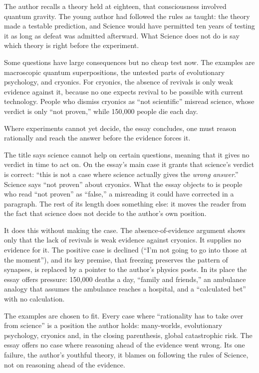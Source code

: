 \begin{afterword}
\summaryhead

The author recalls a theory held at eighteen, that consciousness involved quantum gravity. The young author had followed the rules as taught: the theory made a testable prediction, and Science would have permitted ten years of testing it as long as defeat was admitted afterward. What Science does not do is say which theory is right before the experiment.

Some questions have large consequences but no cheap test now. The examples are macroscopic quantum superpositions, the untested parts of evolutionary psychology, and cryonics. For cryonics, the absence of revivals is only weak evidence against it, because no one expects revival to be possible with current technology. People who dismiss cryonics as ``not scientific'' misread science, whose verdict is only ``not proven,'' while 150,000 people die each day.

Where experiments cannot yet decide, the essay concludes, one must reason rationally and reach the answer before the evidence forces it.

\responsehead

The title says science cannot help on certain questions, meaning that it gives no verdict in time to act on. On the essay's main case it grants that science's verdict is correct: ``this is not a case where science actually gives the \emph{wrong answer}.'' Science says ``not proven'' about cryonics. What the essay objects to is people who read ``not proven'' as ``false,'' a misreading it could have corrected in a paragraph. The rest of its length does something else: it moves the reader from the fact that science does not decide to the author's own position.

It does this without making the case. The absence-of-evidence argument shows only that the lack of revivals is weak evidence against cryonics. It supplies no evidence for it. The positive case is declined (``I'm not going to go into those at the moment''), and its key premise, that freezing preserves the pattern of synapses, is replaced by a pointer to the author's physics posts. In its place the essay offers pressure: 150,000 deaths a day, ``family and friends,'' an ambulance analogy that assumes the ambulance reaches a hospital, and a ``calculated bet'' with no calculation.

The examples are chosen to fit. Every case where ``rationality has to take over from science'' is a position the author holds: many-worlds, evolutionary psychology, cryonics and, in the closing parenthesis, global catastrophic risk. The essay offers no case where reasoning ahead of the evidence went wrong. Its one failure, the author's youthful theory, it blames on following the rules of Science, not on reasoning ahead of the evidence.


\end{afterword}
